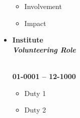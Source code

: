 \begin{itemize}
	\vspace{-0.3cm}
	\begin{itemize}
		\item Involvement
		\item Impact
	\end{itemize}
	
	\item \begin{multicols}{2}
		\begin{flushleft}
			\textbf{Institute}
			\\
			\textbf{\textit{Volunteering Role}}
		\end{flushleft}
		\columnbreak
		\begin{flushright}
			\hspace*{1em} \\
			\textbf{01-0001 -- 12-1000} 
		\end{flushright}
	\end{multicols}
	
	\vspace{-0.3cm}
	\begin{itemize}
		\item Duty 1
		\item Duty 2
	\end{itemize}
	
\end{itemize}	
